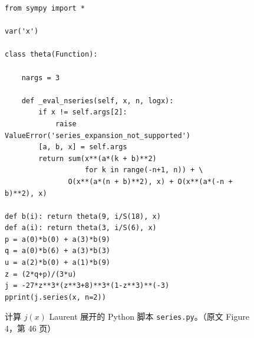 \begin{figure}[htbp]
\begin{lstlisting}
from sympy import *

var('x')

class theta(Function):

    nargs = 3

    def _eval_nseries(self, x, n, logx):
        if x != self.args[2]:
            raise ValueError('series_expansion_not_supported')
        [a, b, x] = self.args
        return sum(x**(a*(k + b)**2)
                   for k in range(-n+1, n)) + \
               O(x**(a*(n + b)**2), x) + O(x**(a*(-n + b)**2), x)

def b(i): return theta(9, i/S(18), x)
def a(i): return theta(3, i/S(6), x)
p = a(0)*b(0) + a(3)*b(9)
q = a(0)*b(6) + a(3)*b(3)
u = a(2)*b(0) + a(1)*b(9)
z = (2*q+p)/(3*u)
j = -27*z**3*(z**3+8)**3*(1-z**3)**(-3)
pprint(j.series(x, n=2))
\end{lstlisting}
\caption{计算 $j(x)$ Laurent 展开的 Python 脚本 \texttt{series.py}。（原文 Figure 4，第 46 页）}
\label{fig:series-py}
\end{figure}

